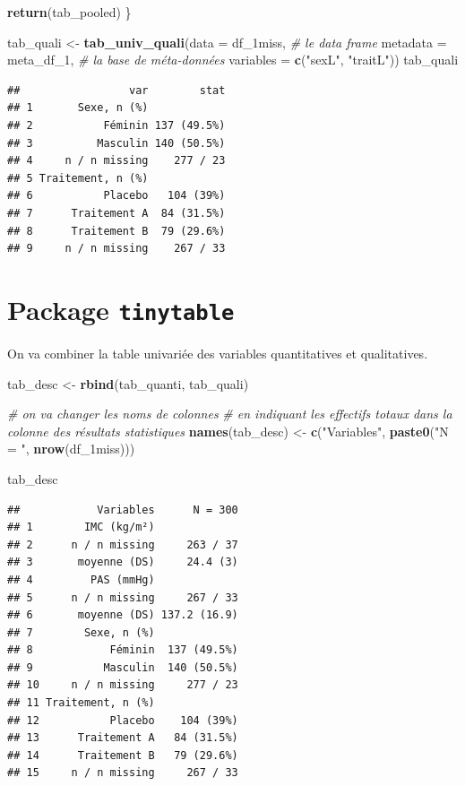 \documentclass[
]{book}
\newenvironment{Shaded}{\begin{snugshade}}{\end{snugshade}}
\newcommand{\AttributeTok}[1]{\textcolor[rgb]{0.13,0.29,0.53}{#1}}
\newcommand{\CommentTok}[1]{\textcolor[rgb]{0.56,0.35,0.01}{\textit{#1}}}
\newcommand{\FunctionTok}[1]{\textcolor[rgb]{0.13,0.29,0.53}{\textbf{#1}}}
\newcommand{\NormalTok}[1]{#1}
\newcommand{\OtherTok}[1]{\textcolor[rgb]{0.56,0.35,0.01}{#1}}
\newcommand{\StringTok}[1]{\textcolor[rgb]{0.31,0.60,0.02}{#1}}
\begin{document}
\begin{Shaded}
\begin{Highlighting}[]
  \FunctionTok{return}\NormalTok{(tab\_pooled)}
\NormalTok{\}}

\NormalTok{tab\_quali }\OtherTok{\textless{}{-}} \FunctionTok{tab\_univ\_quali}\NormalTok{(}\AttributeTok{data =}\NormalTok{ df\_1miss, }\CommentTok{\# le data frame}
                            \AttributeTok{metadata =}\NormalTok{ meta\_df\_1, }\CommentTok{\# la base de méta{-}données}
                            \AttributeTok{variables =} \FunctionTok{c}\NormalTok{(}\StringTok{"sexL"}\NormalTok{, }\StringTok{"traitL"}\NormalTok{))}
\NormalTok{tab\_quali}
\end{Highlighting}
\end{Shaded}

\begin{verbatim}
##                 var        stat
## 1       Sexe, n (%)            
## 2           Féminin 137 (49.5%)
## 3          Masculin 140 (50.5%)
## 4     n / n missing    277 / 23
## 5 Traitement, n (%)            
## 6           Placebo   104 (39%)
## 7      Traitement A  84 (31.5%)
## 8      Traitement B  79 (29.6%)
## 9     n / n missing    267 / 33
\end{verbatim}

\section{\texorpdfstring{Package \texttt{tinytable}}{Package tinytable}}\label{package-tinytable}

On va combiner la table univariée des variables quantitatives et qualitatives.

\begin{Shaded}
\begin{Highlighting}[]
\NormalTok{tab\_desc }\OtherTok{\textless{}{-}} \FunctionTok{rbind}\NormalTok{(tab\_quanti, tab\_quali)}

\CommentTok{\# on va changer les noms de colonnes}
\CommentTok{\# en indiquant les effectifs totaux dans la colonne des résultats statistiques}
\FunctionTok{names}\NormalTok{(tab\_desc) }\OtherTok{\textless{}{-}} \FunctionTok{c}\NormalTok{(}\StringTok{"Variables"}\NormalTok{, }
                     \FunctionTok{paste0}\NormalTok{(}\StringTok{"N = "}\NormalTok{, }\FunctionTok{nrow}\NormalTok{(df\_1miss))) }

\NormalTok{tab\_desc}
\end{Highlighting}
\end{Shaded}

\begin{verbatim}
##            Variables      N = 300
## 1        IMC (kg/m²)             
## 2      n / n missing     263 / 37
## 3       moyenne (DS)     24.4 (3)
## 4         PAS (mmHg)             
## 5      n / n missing     267 / 33
## 6       moyenne (DS) 137.2 (16.9)
## 7        Sexe, n (%)             
## 8            Féminin  137 (49.5%)
## 9           Masculin  140 (50.5%)
## 10     n / n missing     277 / 23
## 11 Traitement, n (%)             
## 12           Placebo    104 (39%)
## 13      Traitement A   84 (31.5%)
## 14      Traitement B   79 (29.6%)
## 15     n / n missing     267 / 33
\end{verbatim}
\end{document}
